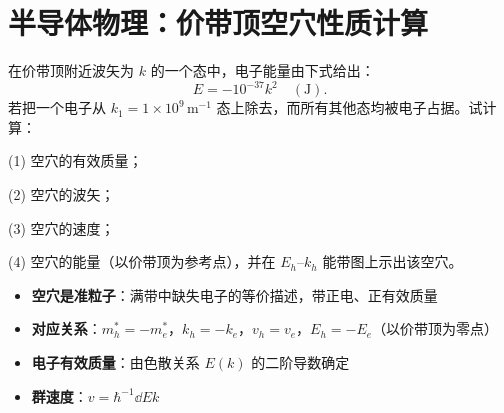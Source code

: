 \section{半导体物理：价带顶空穴性质计算}
\label{sec:hole-properties}

\begin{modelbox}[题目：价带顶附近空穴的准粒子性质]
在价带顶附近波矢为 $k$ 的一个态中，电子能量由下式给出：
\[
E=-10^{-37}k^2\quad(\text{J}).
\]
若把一个电子从 $k_1=1\times10^9\,\text{m}^{-1}$ 态上除去，而所有其他态均被电子占据。试计算：

(1) 空穴的有效质量；

(2) 空穴的波矢；

(3) 空穴的速度；

(4) 空穴的能量（以价带顶为参考点），并在 $E_h$--$k_h$ 能带图上示出该空穴。
\end{modelbox}

\begin{tipbox}[考点快速分析]
\begin{itemize}
    \item \textbf{空穴是准粒子}：满带中缺失电子的等价描述，带正电、正有效质量
    \item \textbf{对应关系}：$m_h^*=-m_e^*$，$k_h=-k_e$，$v_h=v_e$，$E_h=-E_e$（以价带顶为零点）
    \item \textbf{电子有效质量}：由色散关系 $E(k)$ 的二阶导数确定
    \item \textbf{群速度}：$v=\hbar^{-1}\dd{E}{k}$
\end{itemize}
\end{tipbox}

